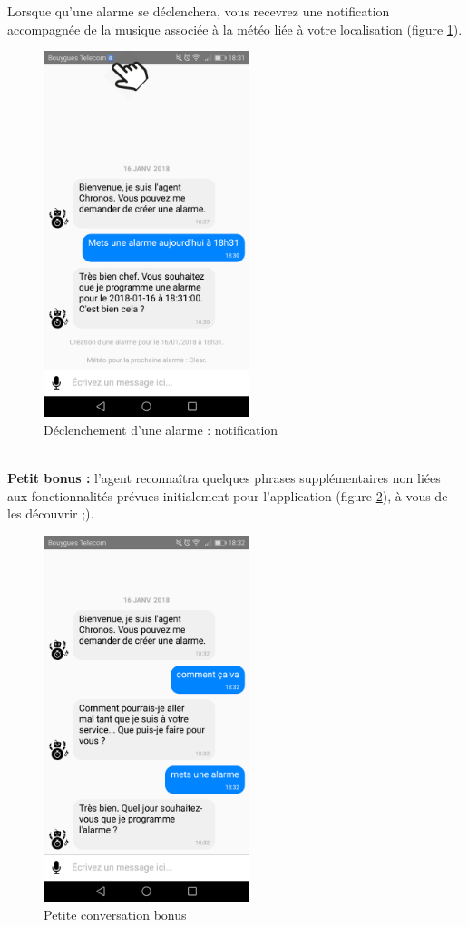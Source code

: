 Lorsque qu'une alarme se déclenchera, vous recevrez une notification accompagnée de la musique associée à la météo liée à votre localisation (figure \ref{H}).

\begin{figure}[H]
  \centering
  \includegraphics[width=6cm]{images/H.png}
  \caption{Déclenchement d'une alarme : notification}
  \label{H}
\end{figure}

~\\\indent
\textbf{Petit bonus :} l'agent reconnaîtra quelques phrases supplémentaires non liées aux fonctionnalités prévues initialement pour l'application (figure \ref{J}), à vous de les découvrir \textsf{;)}.

\begin{figure}[H]
  \centering
  \includegraphics[width=6cm]{images/J.png}
  \caption{Petite conversation bonus}
  \label{J}
\end{figure}
